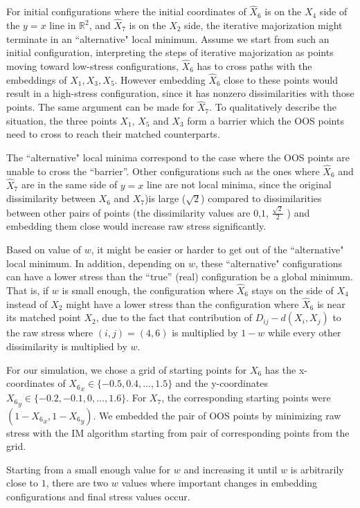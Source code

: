 \documentclass[12pt,oneside,final]{thesis}\usepackage[]{graphicx}\usepackage[]{color}
\begin{document}
For  initial configurations where the initial coordinates of $\hat{X}_6$ is on the $X_4$ side of the $y=x$ line  in  $\mathbb{R}^2$, and $\hat{X}_7$ is on the $X_2$ side, the iterative majorization might terminate  in an ``alternative" local minimum.
Assume we start from such an initial configuration, interpreting the steps of iterative majorization as points moving toward low-stress configurations, $\hat{X}_6$  has to cross paths with the embeddings of  ${X}_1,{X}_3,{X}_5$. However embedding $\hat{X}_6$ close to these points would result in a high-stress configuration, since it has   nonzero dissimilarities with those points. The same argument can be made for $\hat{X}_7$. To qualitatively describe the situation, the three points $X_1$, $X_5$ and $X_3$ form a barrier which the OOS points need to cross  to reach their matched counterparts. 

The ``alternative" local minima correspond to the case where the OOS points are unable to cross the ``barrier''. Other configurations such as the ones where $\hat{X}_6$ and $\hat{X}_7$  are  in the same side of $y=x$ line are not local minima, since the original dissimilarity between $X_6$ and $X_7$)is large ($\sqrt{2}$) compared to dissimilarities between other pairs of points (the dissimilarity  values are $0$,$1$, $\frac{\sqrt{2}}{2}$ ) and embedding them close would increase raw stress significantly.

Based on value of $w$, it might be easier or harder to get out of the  ``alternative" local minimum.
In addition, depending on $w$, these  ``alternative"   configurations can have a lower stress than  the ``true'' (real) configuration  be a global minimum. 
That is, if $w$ is small enough, the configuration where $\hat{X}_6$ stays on the side of $X_4$ instead of $X_2$ might have a lower stress than the configuration where $\hat{X}_6$ is near its matched point $X_2$, due to the fact that  contribution of $ D_{ij}-d(X_i,X_j)$ to the raw stress where $(i,j)=(4,6)$  is  multiplied by $1-w$ while every other dissimilarity is multiplied by $w$. 

For our simulation, we chose a grid of starting points for $X_6$ has the x-coordinates of  ${X_6}_x \in \{-0.5,0.4,\ldots,1.5\}$  and the y-coordinates ${X_6}_y \in  \{-0.2,-0.1,0,\ldots,1.6\}$. For  $X_7$, the corresponding starting points were $(1-{X_6}_x,1-{X_6}_y)$. We embedded the pair of OOS points  by minimizing raw stress with the IM algorithm starting from pair of corresponding points from the grid.

Starting from a small enough value for $w$ and increasing it until $w$ is arbitrarily close to $1$, there are two $w$ values where important changes in embedding configurations and final stress values occur.
\end{document}
